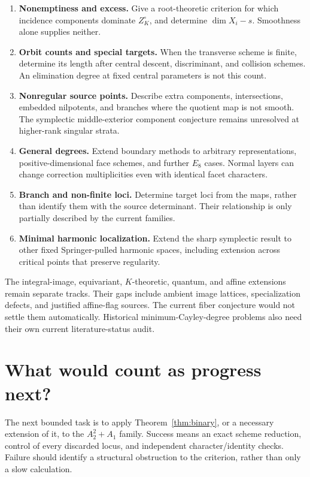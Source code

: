 \documentclass[11pt]{article}
\begin{document}
\begin{enumerate}
\item \textbf{Nonemptiness and excess.} Give a root-theoretic criterion for which incidence components dominate $Z_K^\circ$, and determine $\dim X_i-s$. Smoothness alone supplies neither.
\item \textbf{Orbit counts and special targets.} When the transverse scheme is finite, determine its length after central descent, discriminant, and collision schemes. An elimination degree at fixed central parameters is not this count.
\item \textbf{Nonregular source points.} Describe extra components, intersections, embedded nilpotents, and branches where the quotient map is not smooth. The symplectic middle-exterior component conjecture remains unresolved at higher-rank singular strata.
\item \textbf{General degrees.} Extend boundary methods to arbitrary representations, positive-dimensional face schemes, and further $E_8$ cases. Normal layers can change correction multiplicities even with identical facet characters.
\item \textbf{Branch and non-finite loci.} Determine target loci from the maps, rather than identify them with the source determinant. Their relationship is only partially described by the current families.
\item \textbf{Minimal harmonic localization.} Extend the sharp symplectic result to other fixed Springer-pulled harmonic spaces, including extension across critical points that preserve regularity.
\end{enumerate}

The integral-image, equivariant, $K$-theoretic, quantum, and affine extensions remain separate tracks. Their gaps include ambient image lattices, specialization defects, and justified affine-flag sources. The current fiber conjecture would not settle them automatically. Historical minimum-Cayley-degree problems also need their own current literature-status audit.

\section{What would count as progress next?}

The next bounded task is to apply Theorem~\ref{thm:binary}, or a necessary extension of it, to the $A_2^2+A_1$ family. Success means an exact scheme reduction, control of every discarded locus, and independent character/identity checks. Failure should identify a structural obstruction to the criterion, rather than only a slow calculation.
\end{document}

